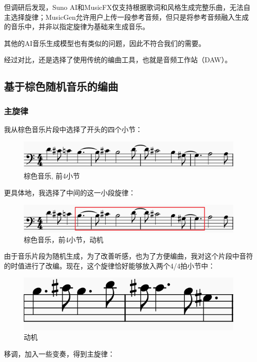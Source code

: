 \documentclass[a4paper,12pt]{article} %
\begin{document}
但调研后发现，Suno AI和MusicFX仅支持根据歌词和风格生成完整乐曲，无法自主选择旋律；MusicGen允许用户上传一段参考音频，但只是将参考音频融入生成的音乐中，并非以指定旋律为基础来生成音乐。

其他的AI音乐生成模型也有类似的问题，因此不符合我们的需要。

经过对比，还是选择了使用传统的编曲工具，也就是音频工作站（DAW）。

\subsection{基于棕色随机音乐的编曲}
\subsubsection{主旋律}
我从棕色音乐片段中选择了开头的四个小节：
\begin{figure}[H]
    \centering
    \includegraphics[width=0.8\linewidth]{images/Brown-motive-1.png}
    \caption{棕色音乐, 前4小节}
\end{figure}

更具体地，我选择了中间的这一小段旋律：

\begin{figure}[H]
    \centering
    \includegraphics[width=0.8\linewidth]{images/Brown-motive-2.png}
    \caption{棕色音乐，前4小节，动机}
\end{figure}

由于音乐片段为随机生成，为了改善听感，也为了方便编曲，我对这个片段中音符的时值进行了改编。现在，这个旋律恰好能够放入两个4/4拍小节中：

\begin{figure}[H]
    \centering
    \includegraphics[width=0.4\linewidth]{images/Brown-motive-3.png}
    \caption{动机}
    \label{fig:brown-motive}
\end{figure}

移调，加入一些变奏，得到主旋律：
\end{document}
